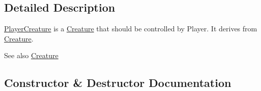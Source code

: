 \subsection{Detailed Description}
\hyperlink{class_player_creature}{Player\+Creature} is a \hyperlink{class_creature}{Creature} that should be controlled by Player. It derives from \hyperlink{class_creature}{Creature}. \begin{DoxySeeAlso}{See also}
\hyperlink{class_creature}{Creature} 
\end{DoxySeeAlso}


\subsection{Constructor \& Destructor Documentation}
